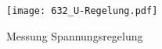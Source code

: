 \begin{flushleft}
\vspace{0.5cm}



\begin{figure}[H]
    \centering
        \texttt{[image: 632\_U-Regelung.pdf]}
    \caption{Messung Spannungsregelung}
    \label{fig:abb1}
\end{figure}












\newpage
{}  %

\end{flushleft}
